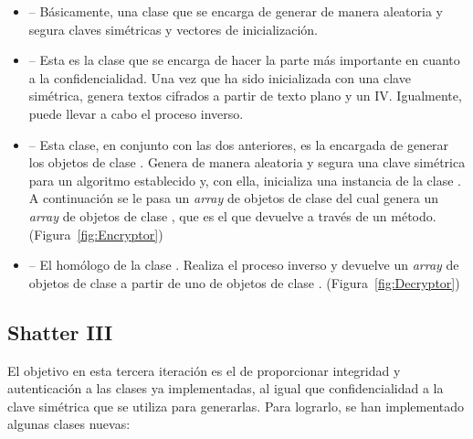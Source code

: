 \begin{itemize}
  \item {} -- Básicamente, una clase que se encarga de generar de manera aleatoria y segura claves simétricas y vectores de inicialización.

  \item {} -- Esta es la clase que se encarga de hacer la parte más importante en cuanto a la confidencialidad. Una vez que ha sido inicializada con una clave simétrica, genera textos cifrados a partir de texto plano y un IV. Igualmente, puede llevar a cabo el proceso inverso.

  \item {} -- Esta clase, en conjunto con las dos anteriores, es la encargada de generar los objetos de clase . Genera de manera aleatoria y segura una clave simétrica para un algoritmo establecido y, con ella, inicializa una instancia de la clase . A continuación se le pasa un \emph{array} de objetos de clase  del cual genera un \emph{array} de objetos de clase , que es el que devuelve a través de un método. (Figura~\ref{fig:Encryptor})

  \item {} -- El homólogo de la clase . Realiza el proceso inverso y devuelve un \emph{array} de objetos de clase  a partir de uno de objetos de clase . (Figura~\ref{fig:Decryptor})
\end{itemize}

\subsection{Shatter III}

El objetivo en esta tercera iteración es el de proporcionar integridad y autenticación a las clases ya implementadas, al igual que confidencialidad a la clave simétrica que se utiliza para generarlas. Para lograrlo, se han implementado algunas clases nuevas:

